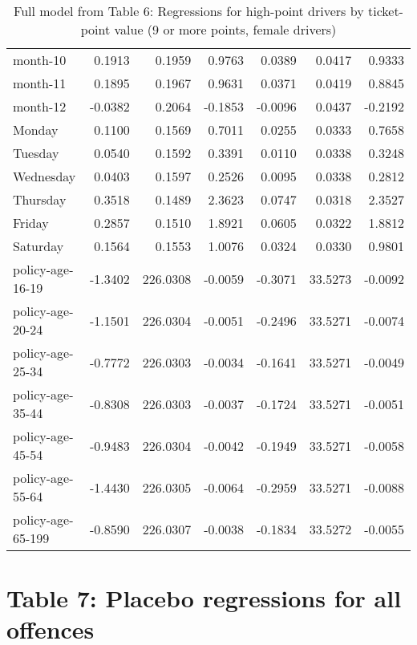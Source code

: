 \documentclass[10pt]{article}
\begin{document}
\begin{table}[ht]
\begin{tabular}{lrrrrrr}
  month-10 & 0.1913 & 0.1959 & 0.9763 & 0.0389 & 0.0417 & 0.9333 \\ 
  month-11 & 0.1895 & 0.1967 & 0.9631 & 0.0371 & 0.0419 & 0.8845 \\ 
  month-12 & -0.0382 & 0.2064 & -0.1853 & -0.0096 & 0.0437 & -0.2192 \\ 
  Monday & 0.1100 & 0.1569 & 0.7011 & 0.0255 & 0.0333 & 0.7658 \\ 
  Tuesday & 0.0540 & 0.1592 & 0.3391 & 0.0110 & 0.0338 & 0.3248 \\ 
  Wednesday & 0.0403 & 0.1597 & 0.2526 & 0.0095 & 0.0338 & 0.2812 \\ 
  Thursday & 0.3518 & 0.1489 & 2.3623 & 0.0747 & 0.0318 & 2.3527 \\ 
  Friday & 0.2857 & 0.1510 & 1.8921 & 0.0605 & 0.0322 & 1.8812 \\ 
  Saturday & 0.1564 & 0.1553 & 1.0076 & 0.0324 & 0.0330 & 0.9801 \\ 
  policy-age-16-19 & -1.3402 & 226.0308 & -0.0059 & -0.3071 & 33.5273 & -0.0092 \\ 
  policy-age-20-24 & -1.1501 & 226.0304 & -0.0051 & -0.2496 & 33.5271 & -0.0074 \\ 
  policy-age-25-34 & -0.7772 & 226.0303 & -0.0034 & -0.1641 & 33.5271 & -0.0049 \\ 
  policy-age-35-44 & -0.8308 & 226.0303 & -0.0037 & -0.1724 & 33.5271 & -0.0051 \\ 
  policy-age-45-54 & -0.9483 & 226.0304 & -0.0042 & -0.1949 & 33.5271 & -0.0058 \\ 
  policy-age-55-64 & -1.4430 & 226.0305 & -0.0064 & -0.2959 & 33.5271 & -0.0088 \\ 
  policy-age-65-199 & -0.8590 & 226.0307 & -0.0038 & -0.1834 & 33.5272 & -0.0055 \\ 
   \hline
\end{tabular}
\caption{Full model from Table 6: Regressions for high-point drivers by ticket-point value (9 or more points, female drivers)} 
\label{tab_6_9plus_pts_F}
\end{table}


\clearpage
\pagebreak




\section{Table 7: Placebo regressions for all offences}
\end{document}
